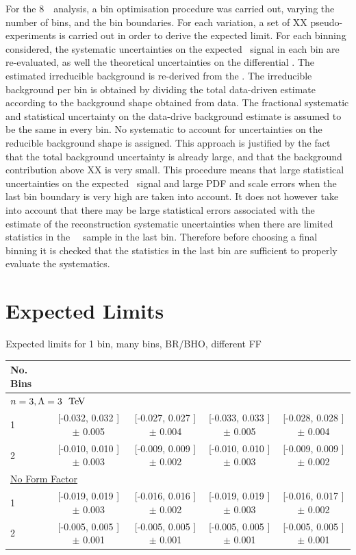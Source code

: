 For the 8~\tev\ analysis, a bin optimisation procedure was carried out, varying
the number of bins, and the bin boundaries. For each variation, a set of XX
pseudo-experiments is carried out in order to derive the expected limit. For
each binning considered, the systematic uncertainties on the expected \sm\ signal
in each bin are re-evaluated, as well the theoretical uncertainties on the
differential \cx. The estimated irreducible background is re-derived from the
\mc. The irreducible background per bin is obtained by dividing the total
data-driven estimate according to the background shape obtained from data. The
fractional systematic and statistical uncertainty on the data-drive background
estimate is assumed to be the same in every bin. No systematic to
account for uncertainties on the reducible background shape is assigned. This
approach is justified by the fact that the total background uncertainty is
already large, and that the background contribution above XX is very small.
This procedure means that large statistical uncertainties on the expected \sm\
signal and large PDF and scale errors when the last bin boundary is very high are taken into account. It does
not however take into account that there may be large statistical errors
associated with the estimate of the reconstruction systematic uncertainties when
there are limited statistics in the \sm\ \mc\ sample in the last bin. Therefore
before choosing a final binning it is checked that the statistics in the last
bin are sufficient to properly evaluate the systematics.

\section{Expected Limits}

Expected limits for 1 bin, many bins, BR/BHO, different FF

 \begin{landscape}
 \thispagestyle{lscape}
\begin{table}[htbp]
\centering
\small
\begin{tabular}{lcccc}
\hline\hline
No. Bins& \ffourg\ & \ffourZ\ & \ffiveg\ & \ffiveg \\
\hline
\multicolumn{2}{l}{\underline{\bf $n=3, \Lambda=3~\tev$} } \\
      1  &  [-0.032, 0.032 ] $\pm$ 0.005 &  [-0.027, 0.027 ] $\pm$ 0.004 &  [-0.033, 0.033 ] $\pm$ 0.005 &  [-0.028, 0.028 ] $\pm$ 0.004 \\
      2  &  [-0.010, 0.010 ] $\pm$ 0.003 &  [-0.009, 0.009 ] $\pm$ 0.002 &  [-0.010, 0.010 ] $\pm$ 0.003 &  [-0.009, 0.009 ] $\pm$ 0.002 \\
\hline
\multicolumn{2}{l}{\underline{ No Form Factor} } \\
      1  &  [-0.019, 0.019 ] $\pm$ 0.003 &  [-0.016, 0.016 ] $\pm$ 0.002 &  [-0.019, 0.019 ] $\pm$ 0.003 &  [-0.016, 0.017 ] $\pm$ 0.002 \\
      2  &  [-0.005, 0.005 ] $\pm$ 0.001 &  [-0.005, 0.005 ] $\pm$ 0.001 &  [-0.005, 0.005 ] $\pm$ 0.001 &  [-0.005, 0.005 ] $\pm$ 0.001 \\
\hline\hline
\end{tabular}
\end{table}
 \end{landscape}

